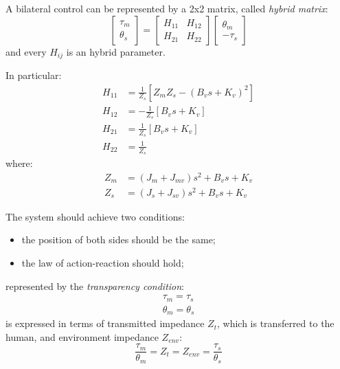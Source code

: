 A bilateral control can be represented by a 2x2 matrix, called \emph{hybrid matrix}:
\begin{equation}
	\begin{bmatrix}
	\tau_m \\ \theta_s
	\end{bmatrix} = 
	\begin{bmatrix}
	H_{11} & H_{12} \\
	H_{21} & H_{22}
	\end{bmatrix}
	\begin{bmatrix}
	\theta_m \\ - \tau_s
	\end{bmatrix}
	\label{hybrid_matrix}
\end{equation}
and every $ H_{ij} $ is an hybrid parameter.

In particular:
\begin{align}
	H_{11} &= \frac{1}{Z_s}[Z_m Z_s - (B_v s + K_v)^2] \\
	H_{12} &= -\frac{1}{Z_s}[B_v s + K_v] \\
	H_{21} &= \frac{1}{Z_s}[B_v s + K_v] \\
	H_{22} &= \frac{1}{Z_s} 
\end{align}
where:
\begin{align}
	Z_m &= (J_m + J_{mv}) s^2 + B_v s + K_v \\
	Z_s &= (J_s + J_{sv}) s^2 + B_v s + K_v
\end{align}

The system should achieve two conditions:
\begin{itemize}
	\item the position of both sides should be the same;
	\item the law of action-reaction should hold;
\end{itemize}
represented by the \emph{transparency condition}:
\begin{align}
	\tau_m = \tau_s \\
	\theta_m = \theta_s
\end{align}
is expressed in terms of transmitted impedance $ Z_t $, which is transferred to the human, and environment impedance $ Z_{env} $:
\begin{equation}
	\frac{\tau_m}{\theta_m} = Z_t = Z_{env} = \frac{\tau_s}{\theta_s}
	\label{transparencY_condition}
\end{equation}

